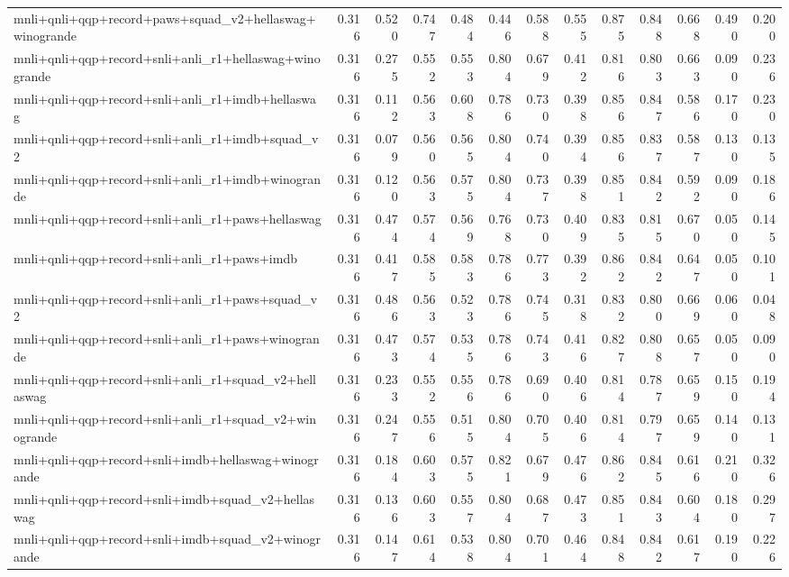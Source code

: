 \begin{table}[t]
\begin{tabular}{lrrrrrrrrrrrr}
    mnli+qnli+qqp+record+paws+squad\_v2+hellaswag+winogrande & 0.316 & 0.520 & 0.747 & 0.484 & 0.446 & 0.588 & 0.555 & 0.875 & 0.848 & 0.668 & 0.490 & 0.200 \\
    mnli+qnli+qqp+record+snli+anli\_r1+hellaswag+winogrande & 0.316 & 0.275 & 0.552 & 0.553 & 0.804 & 0.679 & 0.412 & 0.816 & 0.803 & 0.663 & 0.090 & 0.236 \\
    mnli+qnli+qqp+record+snli+anli\_r1+imdb+hellaswag & 0.316 & 0.112 & 0.563 & 0.608 & 0.786 & 0.730 & 0.398 & 0.856 & 0.847 & 0.586 & 0.170 & 0.230 \\
    mnli+qnli+qqp+record+snli+anli\_r1+imdb+squad\_v2 & 0.316 & 0.079 & 0.560 & 0.565 & 0.804 & 0.740 & 0.394 & 0.856 & 0.837 & 0.587 & 0.130 & 0.135 \\
    mnli+qnli+qqp+record+snli+anli\_r1+imdb+winogrande & 0.316 & 0.120 & 0.563 & 0.575 & 0.804 & 0.737 & 0.398 & 0.851 & 0.842 & 0.592 & 0.090 & 0.186 \\
    mnli+qnli+qqp+record+snli+anli\_r1+paws+hellaswag & 0.316 & 0.474 & 0.574 & 0.569 & 0.768 & 0.730 & 0.409 & 0.835 & 0.815 & 0.670 & 0.050 & 0.145 \\
    mnli+qnli+qqp+record+snli+anli\_r1+paws+imdb & 0.316 & 0.417 & 0.585 & 0.583 & 0.786 & 0.773 & 0.392 & 0.862 & 0.842 & 0.647 & 0.050 & 0.101 \\
    mnli+qnli+qqp+record+snli+anli\_r1+paws+squad\_v2 & 0.316 & 0.486 & 0.563 & 0.523 & 0.786 & 0.745 & 0.318 & 0.832 & 0.800 & 0.669 & 0.060 & 0.048 \\
    mnli+qnli+qqp+record+snli+anli\_r1+paws+winogrande & 0.316 & 0.473 & 0.574 & 0.535 & 0.786 & 0.743 & 0.416 & 0.827 & 0.808 & 0.657 & 0.050 & 0.090 \\
    mnli+qnli+qqp+record+snli+anli\_r1+squad\_v2+hellaswag & 0.316 & 0.233 & 0.552 & 0.556 & 0.786 & 0.690 & 0.406 & 0.814 & 0.787 & 0.659 & 0.150 & 0.194 \\
    mnli+qnli+qqp+record+snli+anli\_r1+squad\_v2+winogrande & 0.316 & 0.247 & 0.556 & 0.515 & 0.804 & 0.705 & 0.406 & 0.814 & 0.797 & 0.659 & 0.140 & 0.131 \\
    mnli+qnli+qqp+record+snli+imdb+hellaswag+winogrande & 0.316 & 0.184 & 0.603 & 0.575 & 0.821 & 0.679 & 0.476 & 0.862 & 0.845 & 0.616 & 0.210 & 0.326 \\
    mnli+qnli+qqp+record+snli+imdb+squad\_v2+hellaswag & 0.316 & 0.136 & 0.603 & 0.557 & 0.804 & 0.687 & 0.473 & 0.851 & 0.843 & 0.604 & 0.180 & 0.297 \\
    mnli+qnli+qqp+record+snli+imdb+squad\_v2+winogrande & 0.316 & 0.147 & 0.614 & 0.538 & 0.804 & 0.701 & 0.464 & 0.848 & 0.842 & 0.617 & 0.190 & 0.226 \\

\end{tabular}
\end{table}
